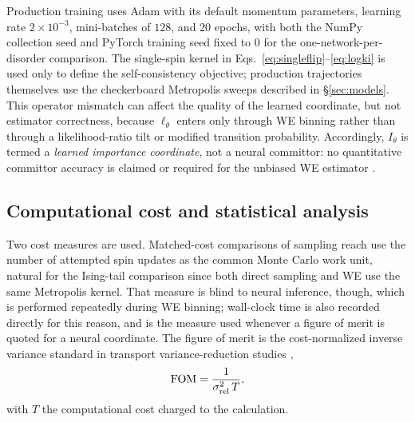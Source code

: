 \documentclass[a4paper,fleqn]{cas-sc}
\newcommand{\FOM}{\mathrm{FOM}}
\begin{document}
Production training uses Adam with its default momentum parameters, learning rate
$2\times10^{-3}$, mini-batches of $128$, and $20$ epochs, with both the NumPy collection seed
and PyTorch training seed fixed to $0$ for the one-network-per-disorder comparison.  The
single-spin kernel in Eqs.~\eqref{eq:singleflip}--\eqref{eq:logki} is used only to define the
self-consistency objective; production trajectories themselves use the checkerboard Metropolis
sweeps described in \S\ref{sec:models}.  This operator mismatch can affect the quality of the
learned coordinate, but not estimator correctness, because $\ell_\theta$ enters only through
WE binning rather than through a likelihood-ratio tilt or modified transition probability.
Accordingly, $I_\theta$ is termed a \emph{learned importance coordinate}, not a neural
committor: no quantitative committor accuracy is claimed or required for the unbiased WE
estimator \citep{zhang2010}.

\subsection{Computational cost and statistical analysis}\label{sec:cost}
Two cost measures are used. Matched-cost comparisons of sampling reach use the number of
attempted spin updates as the common Monte Carlo work unit, natural for the Ising-tail
comparison since both direct sampling and WE use the same Metropolis kernel. That measure is
blind to neural inference, though, which is performed repeatedly during WE binning; wall-clock
time is also recorded directly for this reason, and is the measure used whenever a figure of
merit is quoted for a neural coordinate. The figure of merit is the cost-normalized inverse
variance standard in transport variance-reduction studies \citep{spanier1969,wagnerfw2014},
\begin{equation}
\FOM=\frac{1}{\sigma_{\rm rel}^{2}\,T},
\label{eq:fom}
\end{equation}
with $T$ the computational cost charged to the calculation.
\end{document}

